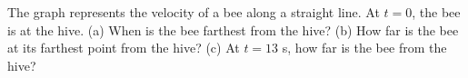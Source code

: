  The graph represents the velocity of a bee along a
straight line.  At $t=0$, the bee is at the hive.  (a) When
is the bee farthest from the hive? (b) How far is the bee at
its farthest point from the hive? (c) At $t=13$ s, how far is
the bee from the hive? \answercheck
